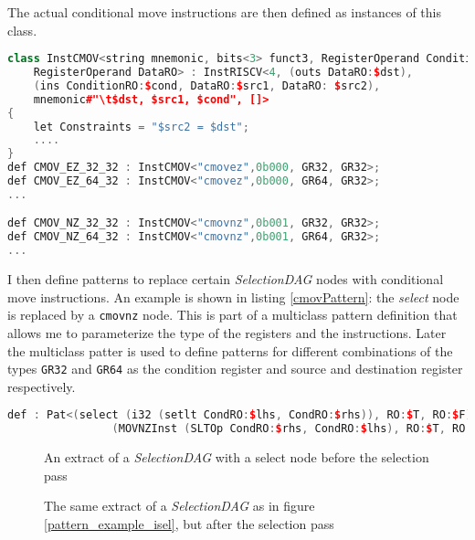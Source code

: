 \documentclass[12pt,twoside,notitlepage]{report}
\begin{document}
The actual conditional move instructions are then defined as instances of this class.

\begin{lstlisting}[label={cmovSelDAGNode}, language=C++, caption={Definition of the conditional move SelectionDAG node; extracted from RISCVInstrInfo.td}]
class InstCMOV<string mnemonic, bits<3> funct3, RegisterOperand ConditionRO, 
	RegisterOperand DataRO> : InstRISCV<4, (outs DataRO:$dst),
	(ins ConditionRO:$cond, DataRO:$src1, DataRO: $src2),
	mnemonic#"\t$dst, $src1, $cond", []>
{
    let Constraints = "$src2 = $dst"; 
    ....
}                 
def CMOV_EZ_32_32 : InstCMOV<"cmovez",0b000, GR32, GR32>;
def CMOV_EZ_64_32 : InstCMOV<"cmovez",0b000, GR64, GR32>;
...

def CMOV_NZ_32_32 : InstCMOV<"cmovnz",0b001, GR32, GR32>;
def CMOV_NZ_64_32 : InstCMOV<"cmovnz",0b001, GR64, GR32>;
...
\end{lstlisting}


I then define patterns to replace certain \textit{SelectionDAG} nodes with conditional move instructions. An example is shown in listing \ref{cmovPattern}: the \textit{select} node is replaced by a \texttt{cmovnz} node. This is part of a multiclass pattern definition that allows me to parameterize the type of the registers and the instructions. Later the multiclass patter is used to define patterns for different combinations of the types \texttt{GR32} and \texttt{GR64} as the condition register and source and destination register respectively.
\begin{lstlisting}[language=C++, label={cmovPattern}, caption=example {\textit{SelectionDAG} pattern; extracted from RISCVInstrInfo.td}]
  def : Pat<(select (i32 (setlt CondRO:$lhs, CondRO:$rhs)), RO:$T, RO:$F),
                (MOVNZInst (SLTOp CondRO:$rhs, CondRO:$lhs), RO:$T, RO:$F)>;
\end{lstlisting}

\begin{figure}[h]
\centering
\caption{An extract of a \textit{SelectionDAG} with a select node before the selection pass}
\end{figure}

\begin{figure}[h]
\centering
\caption{The same extract of a \textit{SelectionDAG} as in figure \ref{pattern_example_isel}, but after the selection pass}
\end{figure}
\end{document}
